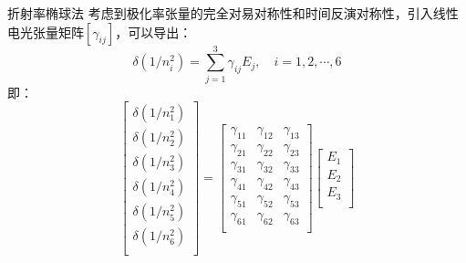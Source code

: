 \documentclass{beamer}
\newenvironment{slide}{
    \begin{frame}{\bfseries{\sectiontitle}}
}{
    \end{frame}
}
\begin{document}
\begin{slide}{折射率椭球法}
    考虑到极化率张量的完全对易对称性和时间反演对称性，引入线性电光张量矩阵$[\gamma_{ij}]$，可以导出：
    \[
        \delta(1 / n_i^2) = \sum_{j = 1}^3\gamma_{ij}E_j,\quad
    i = 1, 2, \cdots, 6
    \]
    即：
    \[
        \begin{bmatrix}
            \delta(1 / n_1^2) \\
            \delta(1 / n_2^2) \\
            \delta(1 / n_3^2) \\
            \delta(1 / n_4^2) \\
            \delta(1 / n_5^2) \\
            \delta(1 / n_6^2) \\
          \end{bmatrix} =
          \begin{bmatrix}
            \gamma_{11} & \gamma_{12} & \gamma_{13} \\
            \gamma_{21} & \gamma_{22} & \gamma_{23} \\
            \gamma_{31} & \gamma_{32} & \gamma_{33} \\
            \gamma_{41} & \gamma_{42} & \gamma_{43} \\
            \gamma_{51} & \gamma_{52} & \gamma_{53} \\
            \gamma_{61} & \gamma_{62} & \gamma_{63} \\
          \end{bmatrix}
          \begin{bmatrix}
            E_1 \\
            E_2 \\
            E_3 \\
          \end{bmatrix}
    \]
\end{slide}
\end{document}
